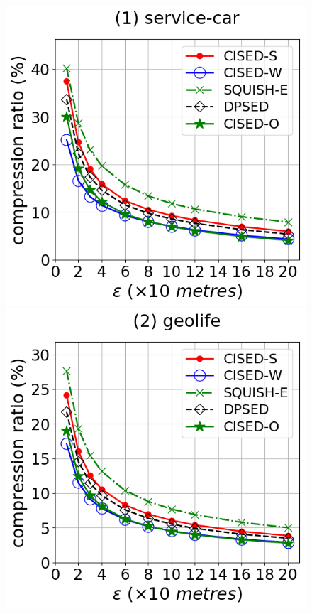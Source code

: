 \begin{figure}[tb!]
\centering
\includegraphics[scale = 0.3]{Figures/Exp-CR-epsilon-service.png}
\includegraphics[scale = 0.3]{Figures/Exp-CR-epsilon-geolife.png}

\end{figure}
